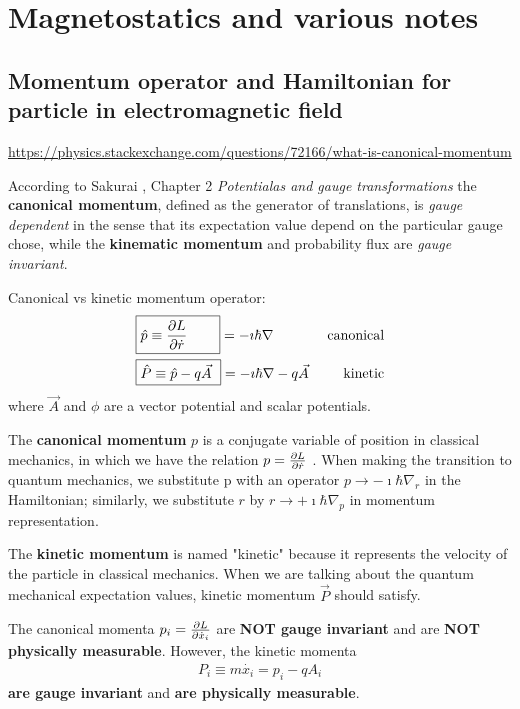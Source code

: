 \documentclass[11pt]{article}
\begin{document}
\newpage
\section {  Magnetostatics and various notes}



\subsection{Momentum operator and Hamiltonian for particle in electromagnetic field}

\url{https://physics.stackexchange.com/questions/72166/what-is-canonical-momentum}

According  to Sakurai \cite{Sakurai-2nd_ed}, Chapter 2 \emph{Potentialas and gauge transformations}  the  {\bf canonical momentum}, defined as  the generator of translations, is \emph{gauge dependent} in the sense that its expectation value depend on the particular gauge chose, while the  {\bf kinematic momentum}  and probability flux are  \emph{gauge invariant}.

 
Canonical vs kinetic momentum operator:
\begin{align*}
    &\boxed{\hat p \equiv \pdv{L}{\dot r} \qquad} =-\imath  \hbar \nabla    & \text{  canonical}  \\
    &\boxed{ \hat P \equiv  \hat p - q \Vec{A} \ }=-\imath  \hbar \nabla -q \vec A & \mbox{ kinetic}
\end{align*}
where $\vec A$ and $\phi$  are  a vector potential and scalar potentials.

The {\bf canonical momentum} $p$ is a conjugate variable of position in classical mechanics, in which we have the relation 
$p=\pdv{L}{\dot r}$
. When making the transition to quantum mechanics, we substitute p
 with an operator $p \to -\imath \hbar \nabla_r$
 in the Hamiltonian; similarly, we substitute $r$  by $r \to +\imath \hbar \nabla_p$  in momentum representation.

The {\bf kinetic momentum} is named "kinetic" because it represents the velocity of the particle in classical mechanics. When we are talking about the quantum mechanical expectation values, kinetic momentum $\vec P$   should satisfy.


The canonical momenta $p_i=\pdv{L}{\dot x_i}$ are {\bf NOT gauge invariant} and are {\bf NOT physically measurable}.  However, the kinetic momenta 
\begin{align*}
    P_i \equiv m\dot{x_i} = p_i - q A_i      
\end{align*}
{\bf are gauge invariant} and  {\bf are physically measurable}.
\end{document}
